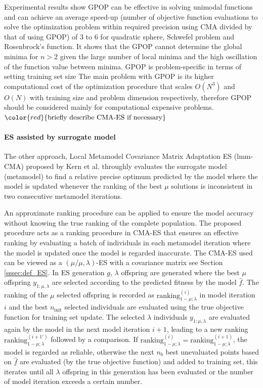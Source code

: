 Experimental results show GPOP can be effective in solving unimodal functions and can achieve an average speed-up (number of objective function evaluations to solve the optimization problem within required precision using CMA divided by that of using GPOP) of 3 to 6 for quadratic sphere, Schwefel problem and Rosenbrock's function. It shows that the GPOP cannot determine the global minima for $n>2$ given the large number of local minima and the high oscillation of the function value between minima. GPOP is problem-specific in terms of setting training set size 
The main problem with GPOP is its higher computational cost of the optimization procedure that scales $O(N^3)$ and $O(N)$ with training size and problem dimension respectively, therefore GPOP should be considered mainly for computational expensive problems.
$\color{red}{\text{briefly describe CMA-ES if necessary}}$


\paragraph{ES assisted by surrogate model}
The other approach, Local Metamodel Covariance Matrix Adaptation ES (lmm-CMA) proposed by Kern et al. \cite{10.1007/11844297_95} throughly evaluates the surrogate model (metamodel) to find a relative precise optimum predicted by the model where the model is updated whenever the ranking of the best $\mu$ solutions is inconsistent in two consecutive metamodel iterations.

An approximate ranking procedure can be applied to ensure the model accuracy without knowing the true ranking of the complete population. The proposed procedure acts as a ranking procedure in CMA-ES that ensures an effective ranking by evaluating a batch of individuals in each metamodel iteration where the model is updated once the model is regarded inaccurate. The CMA-ES used can be viewed as a $(\mu/\mu,\lambda)$-ES with a covariance matrix see Section \ref{sssec:def_ES}. In ES generation $g$, $\lambda$ offspring are generated where the best $\mu$ offspring $y_{1:\mu,\lambda}$ are selected according to the predicted fitness by the model $\hat f$. The ranking of the $\mu$ selected offspring is recorded as $\text{ranking}_{1-\mu;\lambda}^{(i)}$ in model iteration $i$ and the best $n_{\text{init}}$ selected individuals are evaluated using the true objective function for training set update. The selected $\lambda$ individuals $y_{1:\mu,\lambda}$ are evaluated again by the model in the next model iteration $i+1$, leading to a new ranking $\text{ranking}_{1-\mu;\lambda}^{(i+1 \prime)}$ followed by a comparison. If $\text{ranking}_{1-\mu;\lambda}^{(i)} = \text{ranking}_{1-\mu;\lambda}^{(i+1)}$, the model is regarded as reliable, otherwise the next $n_b$ best unevaluated points based on $\hat f$ are evaluated (by the true objective function) and added to training set, this iterates until all $\lambda$ offspring in this generation has been evaluated or the number of model iteration exceeds a certain number.  

